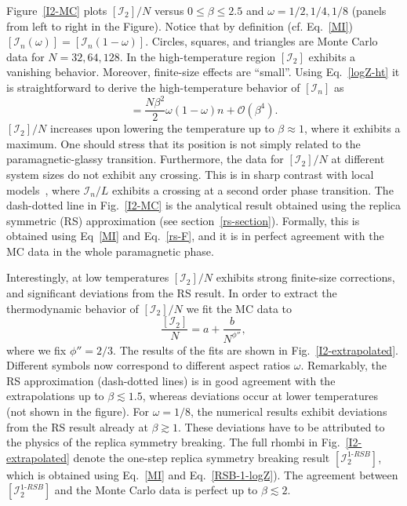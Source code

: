 \documentclass[twocolumn,superscriptaddress,prb,10pt]{revtex4-1}
\begin{document}
Figure~\ref{I2-MC} plots $[{\mathcal I}_2]/N$ versus $0\le\beta\le 2.5$ and $\omega=1/2,1/4,
1/8$ (panels from left to right in the Figure). Notice that by definition (cf. Eq.~\eqref{MI}) 
$[{\mathcal I}_n(\omega)]=[{\mathcal I}_n(1-\omega)]$. Circles, squares, and triangles  
are Monte Carlo data for $N=32,64,128$. In the high-temperature region $[{\mathcal I}_2]$ 
exhibits a vanishing behavior. Moreover, finite-size effects are ``small''. Using Eq.~\eqref{logZ-ht} 
it is straightforward to derive the high-temperature behavior of $[{\mathcal I}_n]$ as  
%
\begin{equation}
[{\mathcal I}_n]=\frac{N\beta^2}{2}\omega(1-\omega)n+{\mathcal O}
(\beta^4).
\end{equation}
%
$[{\mathcal I}_2]/N$ increases upon lowering the temperature up to $\beta\approx 1$, where 
it exhibits a maximum.  
One should stress that its position is not simply related to the paramagnetic-glassy transition. 
Furthermore, the data for $[{\mathcal I}_2]/N$ at different system sizes do not exhibit any crossing. 
This is in sharp contrast with local models~\cite{jaconis-2013}, where ${\mathcal I}_n/L$ exhibits a 
crossing at a second order phase transition. The dash-dotted line in Fig.~\ref{I2-MC} is the 
analytical result obtained using the replica symmetric (RS) approximation (see 
section~\ref{rs-section}). Formally, this is obtained using Eq~\eqref{MI} and Eq.~\eqref{rs-F}, 
and it is in perfect agreement with the MC data in the whole paramagnetic phase.  


Interestingly, at low temperatures $[{\mathcal I}_2]/N$ exhibits strong finite-size corrections, 
and significant deviations from the RS result. In order to extract the thermodynamic behavior of 
$[{\mathcal I}_2]/N$ we fit the MC data to 
%
\begin{equation}
\frac{[{\mathcal I}_2]}{N}=a+\frac{b}{N^{\phi''}},
\end{equation}
%
where we fix $\phi''=2/3$. The results of the fits are shown in Fig.~\ref{I2-extrapolated}.  
Different symbols now correspond to different aspect ratios $\omega$. Remarkably, the RS 
approximation (dash-dotted lines) is in good agreement with the extrapolations up to $\beta\lesssim 1.5$, 
whereas deviations occur at lower temperatures (not shown in the figure). 
For $\omega=1/8$, the numerical results exhibit deviations from the RS result already at $\beta\gtrsim 1$. 
These deviations have to be attributed to the physics of the replica symmetry breaking. 
The full rhombi in Fig.~\ref{I2-extrapolated} denote the one-step replica symmetry breaking result 
$[{\mathcal I}_2^{1\textrm{-}RSB}]$, which is obtained using Eq.~\eqref{MI} and Eq.~\eqref{RSB-1-logZ}). 
The agreement between $[{\mathcal I}_2^{1\textrm{-}RSB}]$ and the Monte Carlo data is perfect 
up to $\beta\lesssim 2$. 
 
\end{document}
